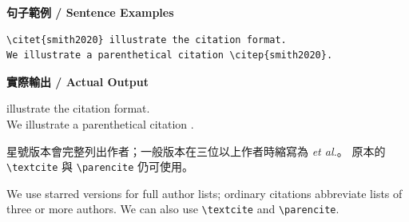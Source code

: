 \documentclass[11pt,a4paper]{article}
\begin{document}
\medskip
\noindent\textbf{句子範例 / Sentence Examples}

\begin{verbatim}
\citet{smith2020} illustrate the citation format.
We illustrate a parenthetical citation \citep{smith2020}.
\end{verbatim}

\noindent\textbf{實際輸出 / Actual Output}

\noindent\citet{smith2020} illustrate the citation format.\\
We illustrate a parenthetical citation \citep{smith2020}.

\medskip
星號版本會完整列出作者；一般版本在三位以上作者時縮寫為 \emph{et al.}。
原本的 \texttt{\textbackslash{}textcite} 與 \texttt{\textbackslash{}parencite} 仍可使用。

We use starred versions for full author lists; ordinary citations abbreviate lists of three or more authors. We can also use \texttt{\textbackslash{}textcite} and \texttt{\textbackslash{}parencite}.
\end{document}
